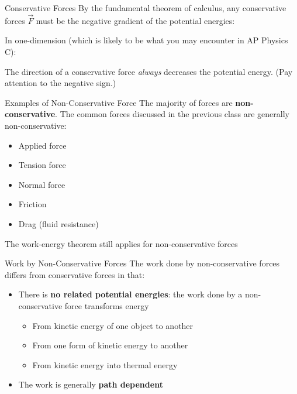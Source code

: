 \documentclass[12pt,compress,aspectratio=169]{beamer}
\begin{document}
\begin{frame}{Conservative Forces}
  By the fundamental theorem of calculus, any conservative forces $\vec F$
  must be the negative gradient of the potential energies:


  In one-dimension (which is likely to be what you may encounter in AP Physics
  C):


  The direction of a conservative force \emph{always} decreases the potential
  energy. (Pay attention to the negative sign.)
\end{frame}



\begin{frame}{Examples of Non-Conservative Force}
  The majority of forces are \textbf{non-conservative}. The common forces
  discussed in the previous class are generally non-conservative:
  \begin{itemize}
  \item Applied force
  \item Tension force
  \item Normal force
  \item Friction
  \item Drag (fluid resistance)
  \end{itemize}
  The work-energy theorem still applies for non-conservative forces
\end{frame}



\begin{frame}{Work by Non-Conservative Forces}
  The work done by non-conservative forces differs from conservative forces in
  that:
  \begin{itemize}
  \item There is \textbf{no related potential energies}: the work done by a
    non-conservative force transforms energy
    \begin{itemize}
    \item From kinetic energy of one object to another
    \item From one form of kinetic energy to another
    \item From kinetic energy into thermal energy
    \end{itemize}
  \item The work is generally \textbf{path dependent}
  \end{itemize}
\end{frame}
\end{document}
